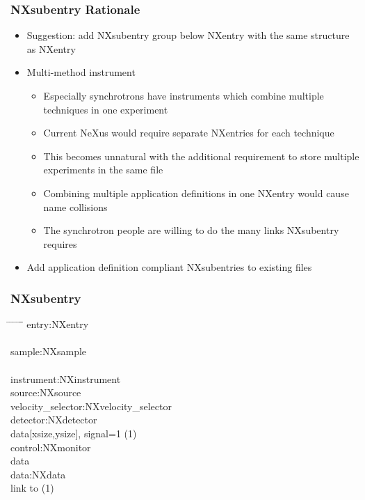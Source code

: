 \documentclass{beamer}
\begin{document}
\begin{frame} \frametitle{NXsubentry Rationale}
\begin{itemize}
\item Suggestion: add NXsubentry group below NXentry with the same structure as NXentry
\item Multi-method instrument
\begin{itemize}
\item Especially synchrotrons have instruments which combine multiple techniques in one experiment
\item Current NeXus would require separate NXentries for each technique
\item This becomes unnatural with the additional requirement to store multiple experiments in the same 
 file
\item Combining multiple application definitions in one NXentry would cause name collisions
\item The synchrotron people are willing to do the many links NXsubentry requires 
\end{itemize}
\item Add application definition compliant NXsubentries to existing files
\end{itemize}
\end{frame}


\begin{frame} \frametitle{NXsubentry}
\begin{tabbing}
\hspace*{1cm} \= \hspace*{1cm} \= \hspace*{1cm} \= \hspace*{1cm} \= \hspace*{1cm} \= \hspace*{1cm}\= \kill
entry:NXentry \\
 \\
 \>  \>sample:NXsample \\
\\
\> \>instrument:NXinstrument\\
\> \> \> source:NXsource\\
\> \> \> velocity\_selector:NXvelocity\_selector\\
\> \> \> detector:NXdetector \\
\> \> \> \>data[xsize,ysize], signal=1 (1)\\
\> \>control:NXmonitor\\
\> \> \>data\\
\> \>data:NXdata\\
\> \> \> link to (1)\\
\end{tabbing}
\end{frame}
\end{document}
